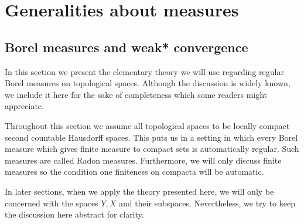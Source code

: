 \documentclass[reqno,11pt, twoside]{amsart}
\theoremstyle{plain}
\theoremstyle{definition}
\theoremstyle{definition}
\theoremstyle{remark}
\numberwithin{equation}{section}
\begin{document}
\section{Generalities about measures}
\subsection{Borel measures and weak* convergence}\label{sec: pushforwards}
In this section we present the elementary theory we will use regarding regular Borel measures on topological spaces. Although the discussion is widely known, we include it here for the sake of completeness which some readers might appreciate.

Throughout this section we assume all topological spaces to be locally compact second countable Hausdorff spaces. This puts us in a setting in which every Borel measure which gives finite measure to compact sets is automatically regular. Such measures are called Radon measures. Furthermore, we will only discuss finite measures so the condition one finiteness on compacta will be automatic.

In later sections, when we apply the theory presented here, we will only be concerned with the spaces $Y,X$ and their subspaces. Nevertheless, we try to keep the discussion here abstract for clarity.
\end{document}
